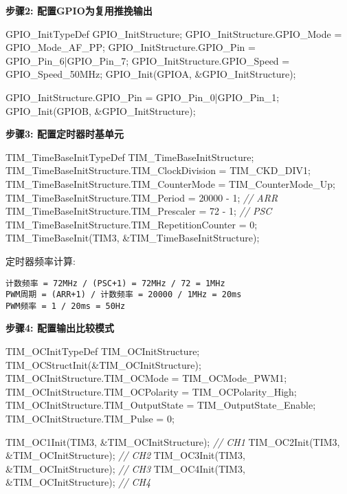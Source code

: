 \documentclass[
]{article}
\newenvironment{Shaded}{}{}
\newcommand{\CommentTok}[1]{\textcolor[rgb]{0.38,0.63,0.69}{\textit{#1}}}
\newcommand{\DecValTok}[1]{\textcolor[rgb]{0.25,0.63,0.44}{#1}}
\newcommand{\NormalTok}[1]{#1}
\begin{document}
\textbf{步骤2: 配置GPIO为复用推挽输出}

\begin{Shaded}
\begin{Highlighting}[]
\NormalTok{GPIO\_InitTypeDef GPIO\_InitStructure;}
\NormalTok{GPIO\_InitStructure.GPIO\_Mode = GPIO\_Mode\_AF\_PP;}
\NormalTok{GPIO\_InitStructure.GPIO\_Pin = GPIO\_Pin\_6|GPIO\_Pin\_7;}
\NormalTok{GPIO\_InitStructure.GPIO\_Speed = GPIO\_Speed\_50MHz;}
\NormalTok{GPIO\_Init(GPIOA, \&GPIO\_InitStructure);}

\NormalTok{GPIO\_InitStructure.GPIO\_Pin = GPIO\_Pin\_0|GPIO\_Pin\_1;}
\NormalTok{GPIO\_Init(GPIOB, \&GPIO\_InitStructure);}
\end{Highlighting}
\end{Shaded}

\textbf{步骤3: 配置定时器时基单元}

\begin{Shaded}
\begin{Highlighting}[]
\NormalTok{TIM\_TimeBaseInitTypeDef TIM\_TimeBaseInitStructure;}
\NormalTok{TIM\_TimeBaseInitStructure.TIM\_ClockDivision = TIM\_CKD\_DIV1;}
\NormalTok{TIM\_TimeBaseInitStructure.TIM\_CounterMode = TIM\_CounterMode\_Up;}
\NormalTok{TIM\_TimeBaseInitStructure.TIM\_Period = }\DecValTok{20000}\NormalTok{ {-} }\DecValTok{1}\NormalTok{;      }\CommentTok{// ARR}
\NormalTok{TIM\_TimeBaseInitStructure.TIM\_Prescaler = }\DecValTok{72}\NormalTok{ {-} }\DecValTok{1}\NormalTok{;      }\CommentTok{// PSC}
\NormalTok{TIM\_TimeBaseInitStructure.TIM\_RepetitionCounter = }\DecValTok{0}\NormalTok{;}
\NormalTok{TIM\_TimeBaseInit(TIM3, \&TIM\_TimeBaseInitStructure);}
\end{Highlighting}
\end{Shaded}

定时器频率计算:

\begin{verbatim}
计数频率 = 72MHz / (PSC+1) = 72MHz / 72 = 1MHz
PWM周期 = (ARR+1) / 计数频率 = 20000 / 1MHz = 20ms
PWM频率 = 1 / 20ms = 50Hz
\end{verbatim}

\textbf{步骤4: 配置输出比较模式}

\begin{Shaded}
\begin{Highlighting}[]
\NormalTok{TIM\_OCInitTypeDef TIM\_OCInitStructure;}
\NormalTok{TIM\_OCStructInit(\&TIM\_OCInitStructure);}
\NormalTok{TIM\_OCInitStructure.TIM\_OCMode = TIM\_OCMode\_PWM1;}
\NormalTok{TIM\_OCInitStructure.TIM\_OCPolarity = TIM\_OCPolarity\_High;}
\NormalTok{TIM\_OCInitStructure.TIM\_OutputState = TIM\_OutputState\_Enable;}
\NormalTok{TIM\_OCInitStructure.TIM\_Pulse = }\DecValTok{0}\NormalTok{;}

\NormalTok{TIM\_OC1Init(TIM3, \&TIM\_OCInitStructure);  }\CommentTok{// CH1}
\NormalTok{TIM\_OC2Init(TIM3, \&TIM\_OCInitStructure);  }\CommentTok{// CH2}
\NormalTok{TIM\_OC3Init(TIM3, \&TIM\_OCInitStructure);  }\CommentTok{// CH3}
\NormalTok{TIM\_OC4Init(TIM3, \&TIM\_OCInitStructure);  }\CommentTok{// CH4}
\end{Highlighting}
\end{Shaded}
\end{document}
